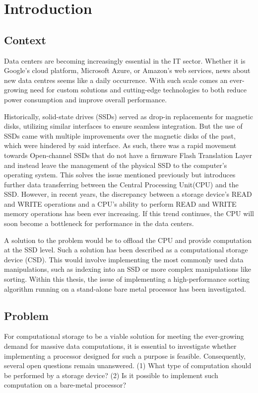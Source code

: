 \section{Introduction}
\subsection{Context}\label{sec:context}
Data centers are becoming increasingly essential in the IT sector. Whether it is
Google's cloud platform, Microsoft Azure, or Amazon's web services, news about
new data centres seems like a daily occurrence. With such scale comes an
ever-growing need for custom solutions and cutting-edge technologies to both
reduce power consumption and improve overall performance.

Historically, solid-state drives (SSDs) served as drop-in replacements for
magnetic disks, utilizing similar interfaces to ensure seamless integration. But
the use of SSDs came with multiple improvements over the magnetic disks of the
past, which were hindered by said interface. As such, there was a rapid movement
towards Open-channel SSDs that do not have a firmware Flash Translation Layer
and instead leave the management of the physical SSD to the computer's operating
system. This solves the issue mentioned previously but introduces further data
transferring between the Central Processing Unit(CPU) and the SSD. However, in
recent years, the discrepancy between a storage device's READ and WRITE
operations and a CPU's ability to perform READ and WRITE memory operations has
been ever increasing. If this trend continues, the CPU will soon become a
bottleneck for performance in the data centers.

A solution to the problem would be to offload the CPU and provide computation at
the SSD level. Such a solution has been described as a computational storage
device (CSD). This would involve implementing the most commonly used data
manipulations, such as indexing into an SSD or more complex manipulations like
sorting. Within this thesis, the issue of implementing a high-performance
sorting algorithm running on a stand-alone bare metal processor has been
investigated.


\subsection{Problem}\label{sec:problem}
For computational storage to be a viable solution for meeting the ever-growing
demand for massive data computations, it is essential to investigate whether
implementing a processor designed for such a purpose is feasible. Consequently,
several open questions remain unanswered. (1) What type of computation should be
performed by a storage device? (2) Is it possible to implement such computation
on a bare-metal processor?

